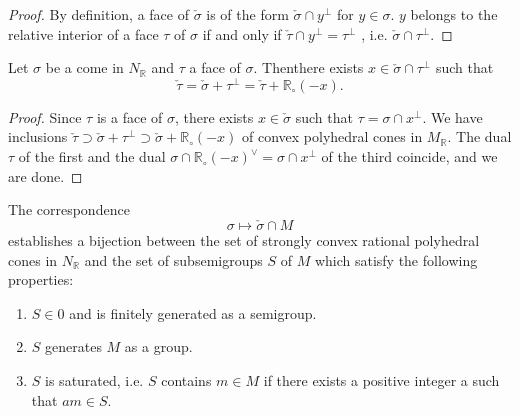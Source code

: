 \begin{proof}
By definition, a face of $\check{\sigma}$ is of the form
$\check{\sigma} \cap y^\perp$ for $y \in \sigma$. $y$ belongs to the
relative interior of a face $\tau$ of $\sigma$ if and only if
$\check{\tau} \cap y^\perp= \tau^\perp $ , i.e. $\check{\sigma} \cap
\tau^\perp$.  
\end{proof}

\begin{prop}\label{chap1:prop3.2} %
Let $\sigma$ be a come in $N_{\mathbb{R}}$ and $\tau$ a face of $\sigma$. 
Then\pageoriginale there exists $x \in \check{\sigma} \cap \tau^\perp$
such that  
$$
\check{\tau}= \check{\sigma} + \tau^\perp = \check{\tau} +
\mathbb{R}_\circ (-x).  
$$
\end{prop}

\begin{proof}
Since $\tau$ is a face of $\sigma$, there exists $x \in
\check{\sigma}$ such that $\tau =\sigma \cap x^\perp$. We have
inclusions $\check{\tau} \supset \check{\sigma} + \tau^\perp \supset
\check{\sigma} + \mathbb{R}_\circ (-x)$ of convex polyhedral cones in
$M_{\mathbb{R}}$. The dual $\tau$ of the first and the dual $\sigma
\cap \mathbb{R}_\circ (-x)^{\vee} = \sigma \cap x^\perp$ of the third
coincide, and we are done.  
\end{proof}

\begin{prop}\label{chap1:prop3.3} %
The correspondence 
$$
\sigma \longmapsto \check{\sigma} \cap M
$$
establishes a bijection between the set of strongly convex rational
polyhedral cones in $N_{\mathbb{R}}$ and the set of subsemigroups $S$
of $M$ which satisfy the following properties:  
\begin{enumerate}[(1)]
\item $S \in 0$ and is finitely generated as a semigroup. 

\item $S$ generates $M$ as a group.  

\item $S$ is saturated, i.e. $S$ contains $ m \in M$ if there
  exists a positive integer a such that $am \in S$.  
\end{enumerate}
\end{prop}

